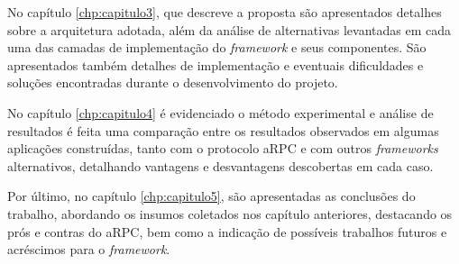 No capítulo \ref{chp:capitulo3}, que descreve a proposta são apresentados detalhes sobre a arquitetura adotada, além da análise de alternativas levantadas em cada uma das camadas de implementação do \textit{framework} e seus componentes. São apresentados também detalhes de implementação e eventuais dificuldades e soluções encontradas durante o desenvolvimento do projeto.

No capítulo \ref{chp:capitulo4} é evidenciado o método experimental e análise de resultados é feita uma comparação entre os resultados observados em algumas aplicações construídas, tanto com o protocolo aRPC e com outros \textit{frameworks} alternativos, detalhando vantagens e desvantagens descobertas em cada caso.

Por último, no capítulo \ref{chp:capitulo5}, são apresentadas as conclusões do trabalho, abordando os insumos coletados nos capítulo anteriores, destacando os prós e contras do aRPC, bem como a indicação de possíveis trabalhos futuros e acréscimos para o \textit{framework}.

\bigskip
